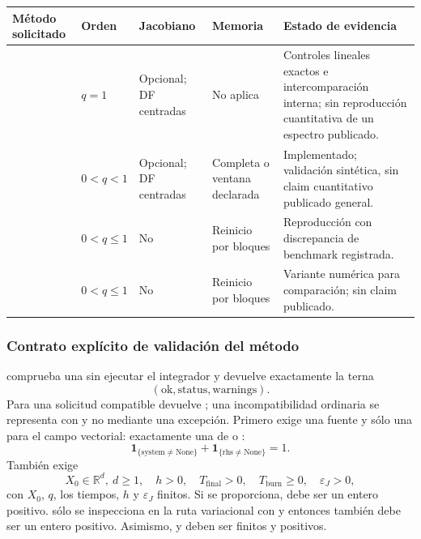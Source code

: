 \begin{center}
\footnotesize
\begin{longtable}{@{}L{0.27\textwidth}L{0.12\textwidth}L{0.13\textwidth}L{0.20\textwidth}L{0.20\textwidth}@{}}
\toprule
Método solicitado & Orden & Jacobiano & Memoria & Estado de evidencia \\
\midrule
{} & \(q=1\) & Opcional; DF centradas & No aplica & Controles lineales exactos e intercomparación interna; sin reproducción cuantitativa de un espectro publicado.\\
 & \(0<q<1\) & Opcional; DF centradas & Completa o ventana declarada & Implementado; validación sintética, sin claim cuantitativo publicado general.\\
 & \(0<q\leq1\) & No & Reinicio por bloques & Reproducción con discrepancia de benchmark registrada.\\
 & \(0<q\leq1\) & No & Reinicio por bloques & Variante numérica para comparación; sin claim publicado.\\
\bottomrule
\end{longtable}
\end{center}

\subsubsection{Contrato explícito de validación del método}

 comprueba una
 sin ejecutar el integrador y devuelve
exactamente la terna
\[
 (\mathrm{ok},\mathrm{status},\mathrm{warnings}).
\]
Para una solicitud compatible devuelve
; una incompatibilidad ordinaria se
representa con  y no mediante una excepción. Primero exige
una fuente y sólo una para el campo vectorial: exactamente una de
 o :
\[
 \mathbf{1}_{\{\mathrm{system}\neq\mathrm{None}\}}+
 \mathbf{1}_{\{\mathrm{rhs}\neq\mathrm{None}\}}=1.
\]
También exige
\[
 X_0\in\mathbb{R}^{d},\ d\geq1,\quad
 h>0,\quad T_{\mathrm{final}}>0,\quad T_{\mathrm{burn}}\geq0,\quad
 \varepsilon_J>0,
\]
con \(X_0\), \(q\), los tiempos, \(h\) y \(\varepsilon_J\) finitos.
Si se proporciona,  debe ser un entero
positivo.  sólo se inspecciona en la ruta variacional
con  y entonces también debe ser un entero
positivo. Asimismo,
 y  deben ser
finitos y positivos.

